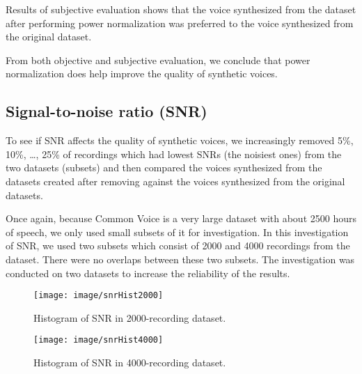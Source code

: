 \documentclass[12pt]{article}
\begin{document}
Results of subjective evaluation shows that the voice synthesized from the dataset after performing power normalization was preferred to the voice synthesized from the original dataset.

From both objective and subjective evaluation, we conclude that power normalization does help improve the quality of synthetic voices.

\subsection{Signal-to-noise ratio (SNR)}
To see if SNR affects the quality of synthetic voices, we increasingly removed 5\%, 10\%, …, 25\% of recordings which had lowest SNRs (the noisiest ones) from the two datasets (subsets) and then compared the voices synthesized from the datasets created after removing against the voices synthesized from the original datasets.

Once again, because Common Voice is a very large dataset with about 2500 hours of speech, we only used small subsets of it for investigation. In this investigation of SNR, we used two subsets which consist of 2000 and 4000 recordings from the dataset. There were no overlaps between these two subsets. The investigation was conducted on two datasets to increase the reliability of the results.

\begin{figure}[t]
\begin{center}
\texttt{[image: image/snrHist2000]}
\end{center}
\vspace{-0.3cm}
\caption[Histogram of SNR in 2000-recording dataset.]{Histogram of SNR in 2000-recording dataset.}
\label{fig_snrHist2000}
\end{figure}

\begin{figure}[t]
\begin{center}
\texttt{[image: image/snrHist4000]}
\end{center}
\vspace{-0.3cm}
\caption[Histogram of SNR in 4000-recording dataset.]{Histogram of SNR in 4000-recording dataset.}
\label{fig_snrHist4000}
\end{figure}
\end{document}
